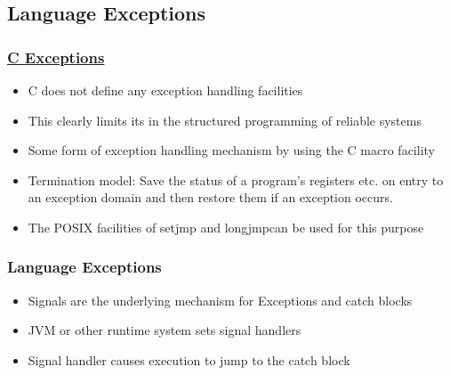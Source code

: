\subsection{Language Exceptions} %
\begin{frame}[fragile]
    \frametitle{\href{https://www.cs.york.ac.uk/rts/books/RTSbookThirdEdition/chap6.pdf}{C Exceptions}}

    \begin{itemize}
        \item C does not define any exception handling facilities
        \item This  clearly  limits  its  in  the  structured  programming  of  reliable systems
        \item Some form of exception handling mechanism by using the C macro facility
        \item Termination  model: Save  the status of a program's registers etc. on entry to an exception domain and then restore them if an exception occurs.
        \item The POSIX facilities of setjmp and longjmpcan be used for this purpose
    \end{itemize}

\end{frame}
\begin{frame}[fragile]
    \frametitle{Language Exceptions}
    \begin{itemize}
        \item Signals are the underlying mechanism for Exceptions and catch blocks \pause
        \item JVM or other runtime system sets signal handlers \pause
        \item Signal handler causes execution to jump to the catch block
    \end{itemize}
\end{frame}
% 
